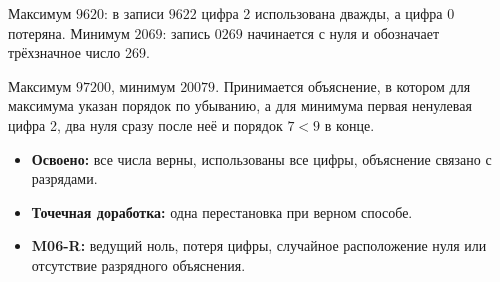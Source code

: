 \begin{teacherbox}
  Максимум \(9620\): в записи \(9622\) цифра 2 использована дважды, а цифра
  0 потеряна. Минимум \(2069\): запись \(0269\) начинается с нуля и обозначает
  трёхзначное число 269.
\end{teacherbox}

\begin{teacherbox}[8. Итог]
  Максимум \(97200\), минимум \(20079\). Принимается объяснение, в котором
  для максимума указан порядок по убыванию, а для минимума \textemdash{} первая
  ненулевая цифра 2, два нуля сразу после неё и порядок \(7<9\) в конце.
\end{teacherbox}

\begin{resultbox}
  \begin{itemize}
    \item \textbf{Освоено:} все числа верны, использованы все цифры, объяснение
      связано с разрядами.
    \item \textbf{Точечная доработка:} одна перестановка при верном способе.
    \item \textbf{M06-R:} ведущий ноль, потеря цифры, случайное расположение
      нуля или отсутствие разрядного объяснения.
  \end{itemize}
\end{resultbox}
